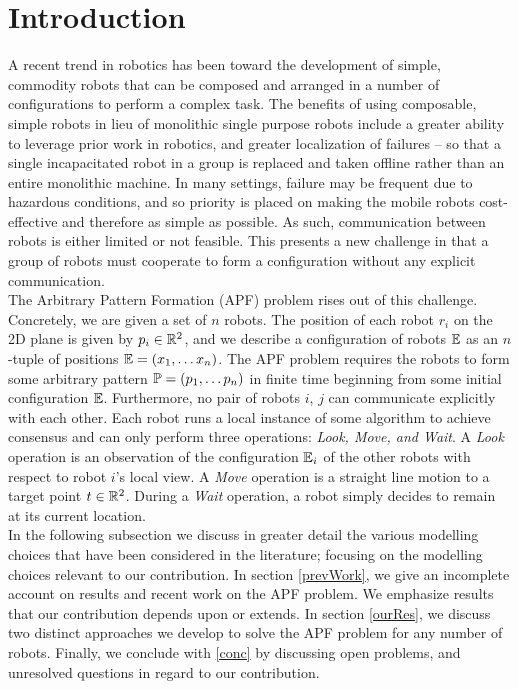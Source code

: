 \documentclass[preprint,10pt]{elsarticle}
\begin{document}
\section{Introduction}
A recent trend in robotics has been toward the development of simple, commodity robots that can
be composed and arranged in a number of configurations to perform a complex task. The benefits of using composable,
simple robots in lieu of monolithic single purpose robots include a greater ability to leverage prior work in
robotics, and greater localization of failures -- so that a single incapacitated robot in a group is replaced
and taken offline rather than an entire monolithic machine. In many settings, failure may be frequent due to 
hazardous conditions, and so priority is placed on making the mobile robots cost-effective and therefore 
as simple as possible. As such, communication between robots is either limited or not feasible. This presents a
new challenge in that a group of robots must cooperate to form a configuration without any explicit communication. \\

The Arbitrary Pattern Formation (APF) problem rises out of this challenge. Concretely, we are given
a set of $n$ robots. The position of each robot $r_i$ on the 2D plane is given by $p_i \in \mathbb{R}^2$, and we
describe a configuration of robots $\mathbb{E}$ as an $n$-tuple of positions $\mathbb{E} = (x_1, \ldots x_n)$.
The APF problem requires the robots to form some arbitrary pattern $\mathbb{P} = (p_1, \ldots p_n)$ in finite
time beginning from some initial configuration $\mathbb{E}$. Furthermore, no pair of robots $i$, $j$ can 
communicate explicitly with each other. Each robot runs a local instance of some algorithm to
achieve consensus and can only perform three operations: \textit{Look, Move, and Wait}. A \textit{Look}
operation is an observation of the configuration $\mathbb{E}_i$ of the other robots with respect to robot
$i$'s local view. A \textit{Move} operation is a straight line motion to a target point $t \in \mathbb{R}^2$.
During a \textit{Wait} operation, a robot simply decides to remain at its current location. \\

In the following subsection we discuss in greater detail the various modelling choices that have been
considered in the literature; focusing on the modelling choices relevant to our contribution. In
section \ref{prevWork}, we give an incomplete account on results and recent work on the APF problem. We
emphasize results that our contribution depends upon or extends. In section \ref{ourRes}, we discuss
two distinct approaches we develop to solve the APF problem for any number of robots. Finally,
we conclude with \ref{conc} by discussing open problems, and unresolved questions in regard to our contribution.
\end{document}
